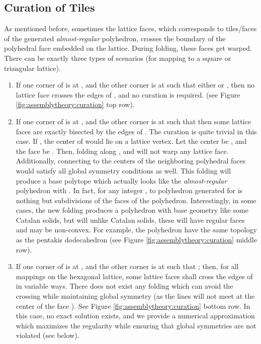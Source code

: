 \documentclass[11pt]{article}
\newcommand{\1}{\mathds{1}}
\begin{document}
\subsection{Curation of Tiles}
\label{sec:assemblytheory:optimization}
As mentioned before, sometimes the lattice faces, which corresponds to tiles/faces of the generated \emph{almost-regular} polyhedron, crosses the boundary of the polyhedral face  embedded on the lattice. During folding, these faces get warped. There can be exactly three types of scenarios (for mapping to a square or triangular lattice).

\begin{enumerate}
 \item If one corner of  is at , and the other corner is at  such that either  or , then no lattice face crosses the edges of , and no curation is required. (see Figure \ref{fig:assemblytheory:curation} top row).
 \item If one corner of  is at , and the other corner is at  such that  then some lattice faces are exactly bisected by the edges of . The curation is quite trivial in this case. If , the center of  would lie on a lattice vertex. Let the center be , and the face  be . Then, folding along ,  and  will not warp any lattice face. Additionally, connecting  to the centers of the neighboring polyhedral faces  would satisfy all global symmetry conditions as well. This folding will produce a base polytope which actually looks like the \emph{almost-regular} polyhedron with . In fact, for any integer , to polyhedron generated for  is nothing but subdivisions of the faces of the  polyhedron. Interestingly, in some cases, the new folding produces a polyhedron with base geometry like some Catalan solids, but will unlike Catalan solids, these will have regular faces and may be non-convex. For example, the  polyhedron have the same topology as the pentakis dodecahedron (see Figure \ref{fig:assemblytheory:curation} middle row).
 \item If one corner of  is at , and the other corner is at  such that ; then, for all mappings on the hexagonal lattice, some lattice faces shall cross the edges of  in variable ways. There does not exist any folding which can avoid the crossing while maintaining global symmetry (as the lines will not meet at the center of the face ). See Figure \ref{fig:assemblytheory:curation} bottom row. In this case, no exact solution exists, and we provide a numerical approximation which maximizes the regularity while ensuring that global symmetries are not violated (see below). 
\end{enumerate}
\end{document}

